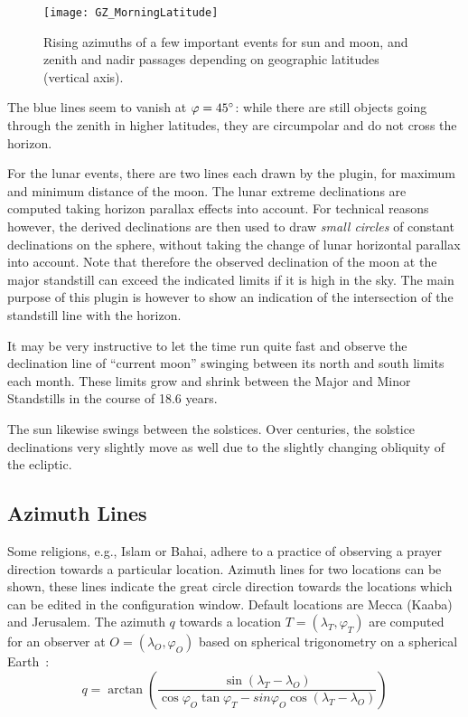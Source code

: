 \begin{figure}[t]
\texttt{[image: GZ\_MorningLatitude]}
\caption{Rising azimuths of a few important events for sun and moon,
  and zenith and nadir passages depending on geographic latitudes
  (vertical axis).}
\label{fig:plugin:ArchaeoLines:MorningLatitudes}
\end{figure}

The blue lines seem to vanish at $\varphi=45\degree$: while there are
still objects going through the zenith in higher latitudes, they are
circumpolar and do not cross the horizon.

For the lunar events, there are two lines each drawn by the plugin,
for maximum and minimum distance of the moon.  The lunar extreme
declinations are computed taking horizon parallax effects into
account. For technical reasons however, the derived declinations are
then used to draw \emph{small circles} of constant declinations on the
sphere, without taking the change of lunar horizontal parallax into
account.  Note that therefore the observed declination of the moon at
the major standstill can exceed the indicated limits if it is high in
the sky. The main purpose of this plugin is however to show an
indication of the intersection of the standstill line with the
horizon.

It may be very instructive to let the time run quite fast and observe
the declination line of ``current moon'' swinging between its north
and south limits each month.  These limits grow and shrink between the
Major and Minor Standstills in the course of 18.6 years.

The sun likewise swings between the solstices. Over centuries, the
solstice declinations very slightly move as well due to the slightly
changing obliquity of the ecliptic.

\subsection{Azimuth Lines}
\label{sec:plugin:ArchaeoLines:Azimuths}

Some religions, e.g., Islam or Bahai, adhere to a practice of
observing a prayer direction towards a particular location.  Azimuth
lines for two locations can be shown, these lines indicate the great
circle direction towards the locations which can be edited in the
configuration window. Default locations are Mecca (Kaaba) and
Jerusalem.  The azimuth $q$ towards a location $T=(\lambda_T,
\varphi_T)$ are computed for an observer at $O=(\lambda_O, \varphi_O)$
based on spherical trigonometry on a spherical
Earth~\cite{Abdali:1997}:
\begin{equation}
  \label{eq:qibla}
  q=\arctan\left(\frac{\sin (\lambda_{T} - \lambda_O) } { \cos\varphi_O \tan\varphi_T - sin \varphi_O \cos(\lambda_{T} - \lambda_O) }\right)
\end{equation}

